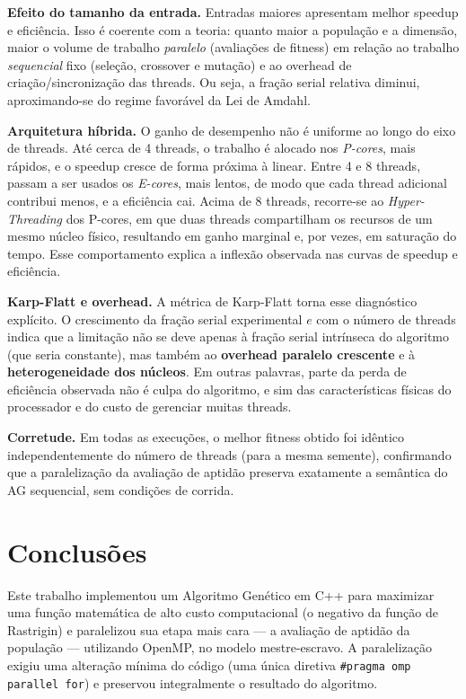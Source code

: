 \documentclass[12pt]{article}
\begin{document}
\textbf{Efeito do tamanho da entrada.} Entradas maiores apresentam melhor
speedup e eficiência. Isso é coerente com a teoria: quanto maior a população e
a dimensão, maior o volume de trabalho \emph{paralelo} (avaliações de fitness)
em relação ao trabalho \emph{sequencial} fixo (seleção, crossover e mutação) e
ao overhead de criação/sincronização das threads. Ou seja, a fração serial
relativa diminui, aproximando-se do regime favorável da Lei de Amdahl.

\textbf{Arquitetura híbrida.} O ganho de desempenho não é uniforme ao longo do
eixo de threads. Até cerca de 4 threads, o trabalho é alocado nos
\emph{P-cores}, mais rápidos, e o speedup cresce de forma próxima à linear.
Entre 4 e 8 threads, passam a ser usados os \emph{E-cores}, mais lentos, de
modo que cada thread adicional contribui menos, e a eficiência cai. Acima de 8
threads, recorre-se ao \emph{Hyper-Threading} dos P-cores, em que duas threads
compartilham os recursos de um mesmo núcleo físico, resultando em ganho
marginal e, por vezes, em saturação do tempo. Esse comportamento explica a
inflexão observada nas curvas de speedup e eficiência.

\textbf{Karp-Flatt e overhead.} A métrica de Karp-Flatt torna esse diagnóstico
explícito. O crescimento da fração serial experimental $e$ com o número de
threads indica que a limitação não se deve apenas à fração serial intrínseca
do algoritmo (que seria constante), mas também ao \textbf{overhead paralelo
crescente} e à \textbf{heterogeneidade dos núcleos}. Em outras palavras, parte
da perda de eficiência observada não é culpa do algoritmo, e sim das
características físicas do processador e do custo de gerenciar muitas threads.

\textbf{Corretude.} Em todas as execuções, o melhor fitness obtido foi
idêntico independentemente do número de threads (para a mesma semente),
confirmando que a paralelização da avaliação de aptidão preserva exatamente a
semântica do AG sequencial, sem condições de corrida.

\section{Conclusões}

Este trabalho implementou um Algoritmo Genético em C++ para maximizar uma
função matemática de alto custo computacional (o negativo da função de
Rastrigin) e paralelizou sua etapa mais cara --- a avaliação de aptidão da
população --- utilizando OpenMP, no modelo mestre-escravo. A paralelização
exigiu uma alteração mínima do código (uma única diretiva
\texttt{\#pragma omp parallel for}) e preservou integralmente o resultado do
algoritmo.
\end{document}
